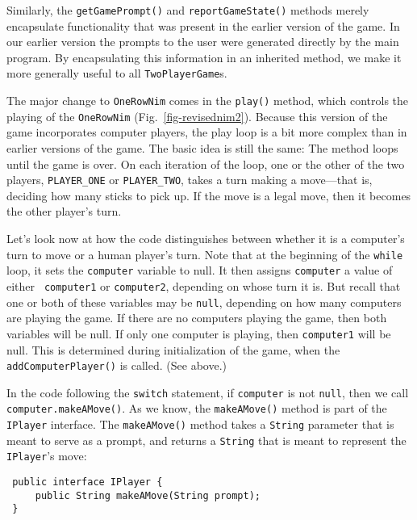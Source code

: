 Similarly, the {\tt getGamePrompt()} and {\tt reportGameState()}
methods merely encapsulate functionality that was present in the
earlier version of the game. In our earlier version the prompts to the
user were generated directly by the main program.  By encapsulating
this information in an inherited method, we make it more generally
useful to all {\tt TwoPlayerGame}s.

The major change to {\tt OneRowNim} comes in the {\tt play()} method,
which controls the playing of the {\tt OneRowNim}
(Fig.~\ref{fig-revisednim2}).  Because this version of the game
incorporates computer players, the play loop is a bit more complex
than in earlier versions of the game.  The basic idea is still the
same: The method loops until the game is over.  On each iteration of
the loop, one or the other of the two players, {\tt PLAYER\_ONE} or
{\tt PLAYER\_TWO}, takes a turn making a move---that is, deciding how
many sticks to pick up. If the move is a legal move, then it becomes
the other player's turn.

Let's look now at how the code distinguishes between whether it is a
computer's turn to move or a human player's turn.  Note that at the
beginning of the {\tt while} loop, it sets the {\tt computer} variable
to null. It then assigns {\tt computer} a value of either {\tt
computer1} or {\tt computer2}, depending on whose turn it is. But
recall that one or both of these variables may be {\tt null},
depending on how many computers are playing the game. If there are no
computers playing the game, then both variables will be null. If only
one computer is playing, then {\tt computer1} will be null. This is
determined during initialization of the game, when the {\tt addComputerPlayer()}
is called. (See above.)

In the code following the {\tt switch} statement, if {\tt computer} is
not {\tt null}, then we call {\tt computer.makeAMove()}. As we know,
the {\tt makeAMove()} method is part of the {\tt IPlayer}
interface. The {\tt makeAMove()} method takes a {\tt String} parameter
that is meant to serve as a prompt, and returns a {\tt String} that is
meant to represent the {\tt IPlayer}'s move:

\begin{jjjlisting}
\begin{lstlisting}
 public interface IPlayer {
     public String makeAMove(String prompt);
 }
\end{lstlisting}
\end{jjjlisting}

